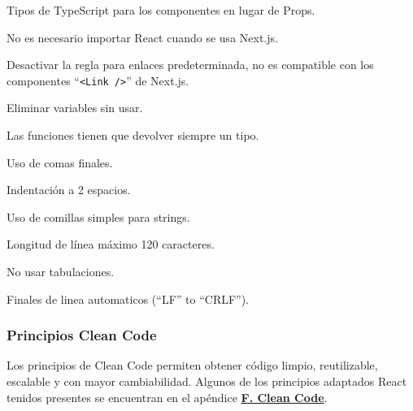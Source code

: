 \documentclass[12pt,twoside,titlepage]{report}
\begin{document}
\begin{compactitem}
    \item Tipos de TypeScript para los componentes en lugar de Props.
    \item No es necesario importar React cuando se usa Next.js.
    \item Desactivar la regla para enlaces predeterminada, no es compatible con los componentes ``\texttt{<Link />}'' de Next.js.
    \item Eliminar variables sin usar.
    \item Las funciones tienen que devolver siempre un tipo.
    \item Uso de comas finales.
    \item Indentación a 2 espacios.
    \item Uso de comillas simples para strings.
    \item Longitud de línea máximo 120 caracteres.
    \item No usar tabulaciones.
    \item Finales de linea automaticos (``LF'' to ``CRLF'').
\end{compactitem}

\subsubsection{Principios Clean Code}
\label{sec:principioscleancode}

Los principios de Clean Code \cite{cleancode} permiten obtener código limpio, reutilizable, escalable y con mayor cambiabilidad. Algunos de los principios adaptados React tenidos presentes se encuentran en el apéndice \hyperref[sec:cleancode]{\textbf{F. Clean Code}}.
\end{document}
